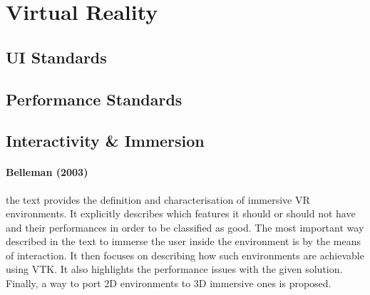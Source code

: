 \section{Virtual Reality}\label{sec:virtual-reality}



\subsection{UI Standards}\label{sec:virtual-reality-ui-standards}



\subsection{Performance Standards}\label{sec:virtual-reality-performance-standards}



\subsection{Interactivity \& Immersion}\label{sec:virtual-reality-interactivity-and-immersion}

\paragraph{Belleman (2003) \cite{belleman_interactive_2003}} the text provides the definition and characterisation of immersive VR environments. It explicitly describes which features it should or should not have and their performances in order to be classified as good. The most important way described in the text to immerse the user inside the environment is by the means of interaction. It then focuses on describing how such environments are achievable using VTK. It also highlights the performance issues with the given solution. Finally, a way to port 2D environments to 3D immersive ones is proposed.